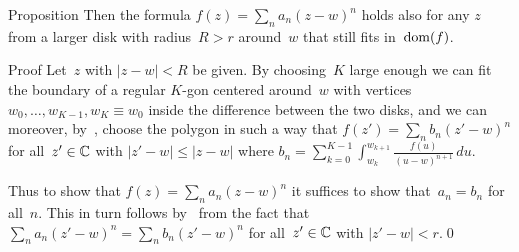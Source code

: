 \documentclass[a]{subfiles}
\begin{document}
\begin{parsec}
\begin{point}{Proposition}
Then the formula $f(z)=\sum_n a_n (z-w)^n$
holds also for any $z$ from a larger disk 
with radius~$R>r$
around~$w$ that still fits in~$\operatorname{dom}(f)$.
\begin{point}{Proof}%
Let~$z$ with $\left|z-w\right|<R$ be given.
By choosing~$K$ large enough
we can fit the boundary of a regular $K$-gon
centered around~$w$
with vertices $w_0,\dotsc,w_{K-1},w_{K}\equiv w_0$
inside the difference between the two disks,
and we can moreover, by~,
choose the polygon
in such a way that
$f(z')=\sum_n b_n (z'-w)^n$
for all~$z'\in\mathbb{C}$
with $\left|z'-w\right|\leq \left|z-w\right|$
where $b_n = \sum_{k=0}^{K-1}
\int_{w_k}^{w_{k+1}}
\frac{f(u)}{(u-w)^{n+1}}\,du$.

Thus to show that $f(z)=\sum_n a_n (z-w)^n$
it suffices to show that~$a_n=b_n$ for all~$n$.
This in turn
follows by~ from the fact
that $\sum_n a_n (z'-w)^n
= \sum_n b_n (z'-w)^n$
for all~$z'\in \mathbb{C}$ with $\left|z'-w\right|<r$.\qed
\end{point}
\end{point}
\end{parsec}
\end{document}
